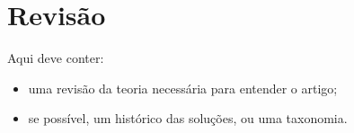 \section{Revisão}

Aqui deve conter:
\begin{itemize}
    \item uma revisão da teoria necessária para entender o artigo;
    \item se possível, um histórico das soluções, ou uma taxonomia.
\end{itemize}


